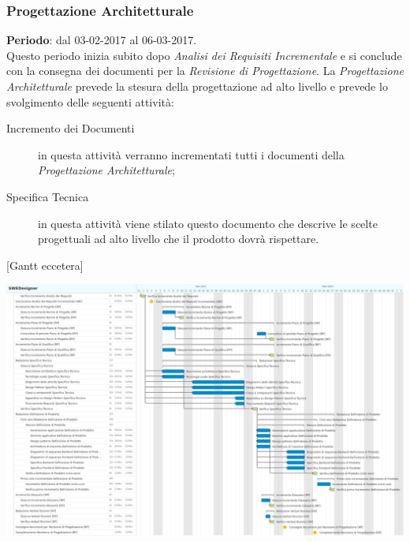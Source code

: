 	\subsubsection{Progettazione Architetturale} \label{sec:PA}
	\textbf{Periodo}: dal 03-02-2017 al 06-03-2017.	
	\\ Questo periodo inizia subito dopo \emph{Analisi dei Requisiti Incrementale} e si conclude con la consegna dei documenti per la \emph{Revisione di Progettazione}. La \emph{Progettazione Architetturale} prevede la stesura della progettazione ad alto  livello e prevede lo svolgimento delle seguenti attività:
	\begin{description}
		\item[Incremento dei Documenti] in questa attività verranno incrementati tutti i documenti della \emph{Progettazione Architetturale};
		\item[Specifica Tecnica] in questa attività viene stilato questo documento che descrive le scelte progettuali ad alto livello che il prodotto dovrà rispettare.
	\end{description}
	[Gantt eccetera]
	
	{\includegraphics[width=15cm]{img/ganttpa.png}\par}

